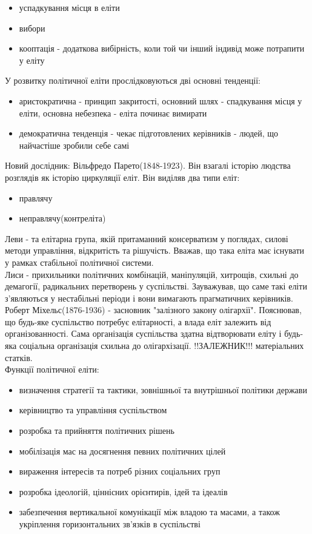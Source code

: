 \begin{itemize}
\item успадкування місця в еліти
\item вибори
\item кооптація - додаткова вибірність, коли той чи інший індивід може потрапити у еліту
\end{itemize}
У розвитку політичної еліти прослідковуються  дві основні тенденції:
\begin{itemize}
\item аристократична  - принцип закритості, основний шлях - спадкування місця у еліти, основна небезпека - еліта починає вимирати 
\item демократична тенденція - чекає підготовлених керівників - людей, що найчастіше зробили себе самі
\end{itemize}  
Новий дослідник: Вільфредо Парето(1848-1923). Він взагалі історію людства розглядів як історію циркуляції еліт.
Він виділяв два типи еліт:
\begin{itemize}
\item правлячу
\item неправлячу(контреліта) 
\end{itemize}
Леви  - та елітарна група, якій притаманний консерватизм у поглядах, силові методи управління, відкритість та рішучість. Вважав, що така еліта має існувати у рамках стабільної політичної системи.\\
Лиси - прихильники політичних комбінацій, маніпуляцій, хитрощів, схильні до демагогії, радикальних перетворень у суспільстві. Зауважував, що саме такі еліти з’являються у нестабільні періоди і вони вимагають прагматичних керівників.\\
Роберт Міхельс(1876-1936) - засновник "залізного закону олігархії". Пояснював, що будь-яке суспільство потребує елітарності, а влада еліт залежить від організованності. Сама організація суспільства здатна відтворювати еліту і будь-яка соціальна організація схильна до олігархізації.
!!ЗАЛЕЖНИК!!! матеріальних статків.\\
Функції політичної еліти:
\begin{itemize}
\item визначення стратегії та тактики, зовнішньої та внутрішньої політики держави
\item керівництво та управління суспільством
\item розробка та прийняття політичних рішень
\item мобілізація мас на досягнення певних політичних цілей
\item вираження інтересів та потреб різних соціальних груп
\item розробка ідеологій, ціннісних орієнтирів, ідей та ідеалів
\item забезпечення вертикальної комунікації між владою та масами, а також укріплення горизонтальних зв’язків в суспільстві 
\end{itemize}
